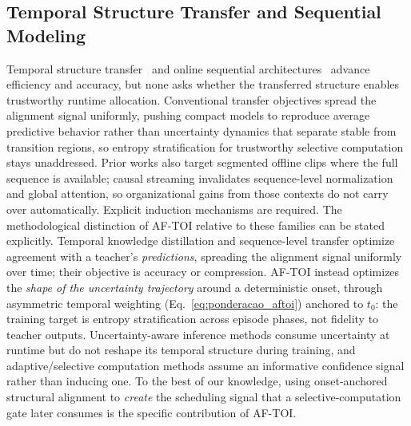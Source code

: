 \documentclass[a4paper,fleqn]{cas-dc}
\begin{document}
\subsection{Temporal Structure Transfer and Sequential Modeling}
\label{sec:rel_temporal}
Temporal structure transfer~\cite{hinton2015distilling,bajestani2020tkd,zheng2024tempdistiller} and online sequential architectures~\cite{zhao2022testra,lstr2021} advance efficiency and accuracy, but none asks whether the transferred structure enables trustworthy runtime allocation. Conventional transfer objectives spread the alignment signal uniformly, pushing compact models to reproduce average predictive behavior rather than uncertainty dynamics that separate stable from transition regions, so entropy stratification for trustworthy selective computation stays unaddressed. Prior works also target segmented offline clips where the full sequence is available; causal streaming invalidates sequence-level normalization and global attention, so organizational gains from those contexts do not carry over automatically. Explicit induction mechanisms are required.
{\color{\revcolor}The methodological distinction of \mbox{AF-TOI} relative to these
families can be stated explicitly. Temporal knowledge distillation and
sequence-level transfer optimize agreement with a teacher's
\emph{predictions}, spreading the alignment signal uniformly over time; their
objective is accuracy or compression. \mbox{AF-TOI} instead optimizes the
\emph{shape of the uncertainty trajectory} around a deterministic onset,
through asymmetric temporal weighting (Eq.~\ref{eq:ponderacao_aftoi}) anchored
to $t_0$: the training target is entropy stratification across episode phases,
not fidelity to teacher outputs. Uncertainty-aware inference methods consume
uncertainty at runtime but do not reshape its temporal structure during
training, and adaptive/selective computation methods assume an informative
confidence signal rather than inducing one. To the best of our knowledge,
using onset-anchored structural alignment to \emph{create} the scheduling
signal that a selective-computation gate later consumes is the specific
contribution of \mbox{AF-TOI}.}
\end{document}
